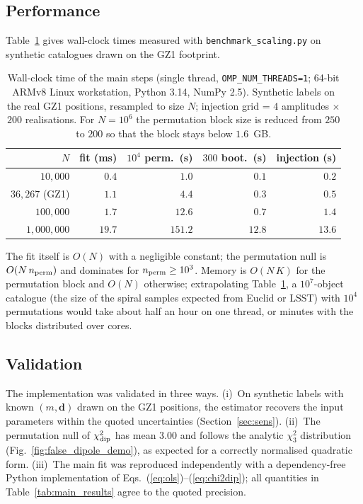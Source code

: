 \documentclass[preprint,12pt]{elsarticle}
\begin{document}
\subsection{Performance}
\label{sec:performance}

Table~\ref{tab:timing} gives wall-clock times measured with \texttt{benchmark\_scaling.py} on synthetic catalogues drawn on the GZ1 footprint.
\begin{table}[t]
\caption{\label{tab:timing}Wall-clock time of the main steps (single thread, \texttt{OMP\_NUM\_THREADS=1}; 64-bit ARMv8 Linux workstation, Python 3.14, NumPy 2.5). Synthetic labels on the real GZ1 positions, resampled to size $N$; injection grid = $4$ amplitudes $\times$ $200$ realisations. For $N=10^6$ the permutation block size is reduced from $250$ to $200$ so that the block stays below $1.6$~GB.}
\centering
\small
\begin{tabular}{rrrrr}
\toprule
$N$ & fit (ms) & $10^4$ perm.\ (s) & $300$ boot.\ (s) & injection (s)\\
\midrule
$10{,}000$ & $0.4$ & $1.0$ & $0.1$ & $0.2$\\
$36{,}267$ (GZ1) & $1.1$ & $4.4$ & $0.3$ & $0.5$\\
$100{,}000$ & $1.7$ & $12.6$ & $0.7$ & $1.4$\\
$1{,}000{,}000$ & $19.7$ & $151.2$ & $12.8$ & $13.6$\\
\bottomrule
\end{tabular}
\end{table}
The fit itself is $O(N)$ with a negligible constant; the permutation null is $O(N\,n_{\rm perm})$ and dominates for $n_{\rm perm}\ge10^3$.
Memory is $O(N\,K)$ for the permutation block and $O(N)$ otherwise; extrapolating Table~\ref{tab:timing}, a $10^7$-object catalogue (the size of the spiral samples expected from Euclid or LSST) with $10^4$ permutations would take about half an hour on one thread, or minutes with the blocks distributed over cores.

\subsection{Validation}

The implementation was validated in three ways.
(i)~On synthetic labels with known $(m,\mathbf d)$ drawn on the GZ1 positions, the estimator recovers the input parameters within the quoted uncertainties (Section~\ref{sec:sens}).
(ii)~The permutation null of $\chi^2_{\rm dip}$ has mean $3.00$ and follows the analytic $\chi^2_3$ distribution (Fig.~\ref{fig:false_dipole_demo}), as expected for a correctly normalised quadratic form.
(iii)~The main fit was reproduced independently with a dependency-free Python implementation of Eqs.~(\ref{eq:ols})--(\ref{eq:chi2dip}); all quantities in Table~\ref{tab:main_results} agree to the quoted precision.
\end{document}
